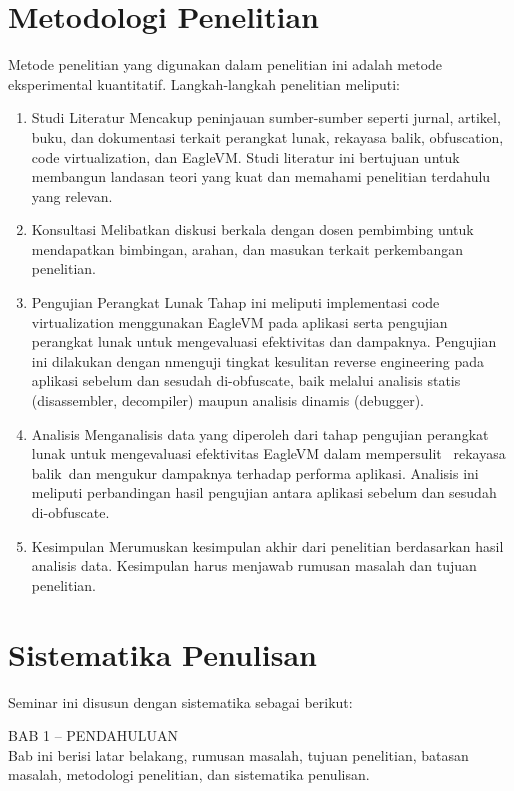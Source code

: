 \section{Metodologi Penelitian}
Metode penelitian yang digunakan dalam penelitian ini adalah metode eksperimental kuantitatif. Langkah-langkah penelitian meliputi:
\begin{enumerate}
	\item Studi Literatur
	      Mencakup peninjauan sumber-sumber seperti jurnal, artikel, buku, dan dokumentasi terkait perangkat lunak, rekayasa balik, obfuscation, code virtualization, dan EagleVM. Studi literatur ini bertujuan untuk membangun landasan teori yang kuat dan memahami penelitian terdahulu yang relevan.
	\item Konsultasi
	      Melibatkan diskusi berkala dengan dosen pembimbing untuk mendapatkan bimbingan, arahan, dan masukan terkait perkembangan penelitian.
	\item Pengujian Perangkat Lunak
	      Tahap ini meliputi implementasi code virtualization menggunakan EagleVM pada aplikasi serta pengujian perangkat lunak untuk mengevaluasi efektivitas dan dampaknya. Pengujian ini dilakukan dengan nmenguji tingkat kesulitan reverse engineering pada aplikasi sebelum dan sesudah di-obfuscate, baik melalui analisis statis (disassembler, decompiler) maupun analisis dinamis (debugger).
	\item Analisis
	      Menganalisis data yang diperoleh dari tahap pengujian perangkat lunak untuk mengevaluasi efektivitas EagleVM dalam mempersulit  rekayasa balik dan mengukur dampaknya terhadap performa aplikasi. Analisis ini meliputi perbandingan hasil pengujian antara aplikasi sebelum dan sesudah di-obfuscate.
	\item Kesimpulan
	      Merumuskan kesimpulan akhir dari penelitian berdasarkan hasil analisis data. Kesimpulan harus menjawab rumusan masalah dan tujuan penelitian.
\end{enumerate}

\section{Sistematika Penulisan}
Seminar ini disusun dengan sistematika sebagai berikut:

BAB 1 – PENDAHULUAN \\
Bab ini berisi latar belakang, rumusan masalah, tujuan penelitian, batasan masalah, metodologi penelitian, dan sistematika penulisan.

